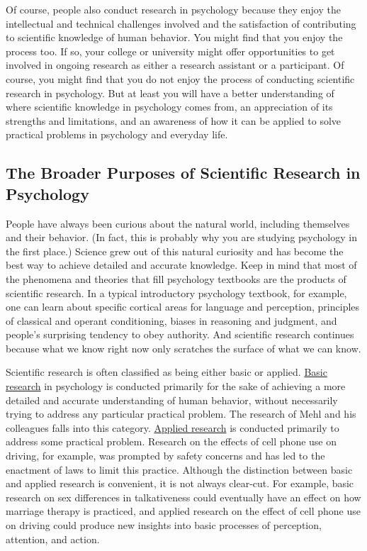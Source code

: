 \documentclass[
]{krantz}
\begin{document}
Of course, people also conduct research in psychology because they enjoy the intellectual and technical challenges involved and the satisfaction of contributing to scientific knowledge of human behavior. You might find that you enjoy the process too. If so, your college or university might offer opportunities to get involved in ongoing research as either a research assistant or a participant. Of course, you might find that you do not enjoy the process of conducting scientific research in psychology. But at least you will have a better understanding of where scientific knowledge in psychology comes from, an appreciation of its strengths and limitations, and an awareness of how it can be applied to solve practical problems in psychology and everyday life.

\subsection*{The Broader Purposes of Scientific Research in Psychology}\label{the-broader-purposes-of-scientific-research-in-psychology}


People have always been curious about the natural world, including themselves and their behavior. (In fact, this is probably why you are studying psychology in the first place.) Science grew out of this natural curiosity and has become the best way to achieve detailed and accurate knowledge. Keep in mind that most of the phenomena and theories that fill psychology textbooks are the products of scientific research. In a typical introductory psychology textbook, for example, one can learn about specific cortical areas for language and perception, principles of classical and operant conditioning, biases in reasoning and judgment, and people's surprising tendency to obey authority. And scientific research continues because what we know right now only scratches the surface of what we can know.

Scientific research is often classified as being either basic or applied. \hyperref[basic-research]{Basic research} in psychology is conducted primarily for the sake of achieving a more detailed and accurate understanding of human behavior, without necessarily trying to address any particular practical problem. The research of Mehl and his colleagues falls into this category. \hyperref[applied-research]{Applied research} is conducted primarily to address some practical problem. Research on the effects of cell phone use on driving, for example, was prompted by safety concerns and has led to the enactment of laws to limit this practice. Although the distinction between basic and applied research is convenient, it is not always clear-cut. For example, basic research on sex differences in talkativeness could eventually have an effect on how marriage therapy is practiced, and applied research on the effect of cell phone use on driving could produce new insights into basic processes of perception, attention, and action.
\end{document}
